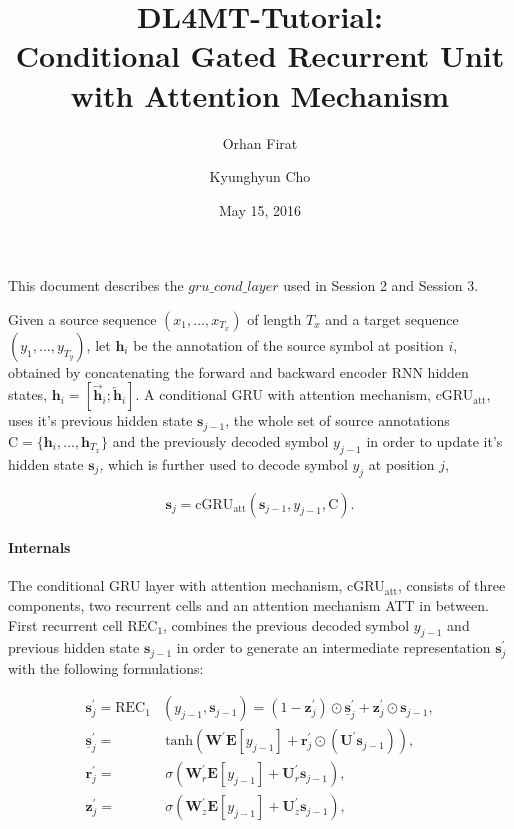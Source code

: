 \documentclass[11pt, oneside]{article}
\title{DL4MT-Tutorial: \\Conditional Gated Recurrent Unit with Attention Mechanism}
\author{Orhan Firat \and Kyunghyun Cho}
\date{May 15, 2016}
\theoremstyle{definition}
\newcommand{\vect}[1]{\mathbf{#1}}
\newcommand{\matr}[1]{\mathbf{#1}}
\newcommand{\vh}[0]{\vect{h}}
\newcommand{\vz}[0]{\vect{z}}
\newcommand{\vs}[0]{\vect{s}}
\newcommand{\vr}[0]{\vect{r}}
\newcommand{\mW}[0]{\matr{W}}
\newcommand{\mE}[0]{\matr{E}}
\newcommand{\mU}[0]{\matr{U}}
\newcommand{\ola}{\overleftarrow}
\newcommand{\ora}{\overrightarrow}
\begin{document}
\maketitle

This document describes the $gru\_cond\_layer$ used in Session 2 and Session 3.

Given a source sequence $(x_1, \dots,x_{T_x})$ of length $T_x$ and a target
sequence $(y_1,\dots,y_{T_y})$, let $\vh_i$ be the annotation of the source symbol 
at position $i$, obtained by concatenating the forward and backward encoder RNN 
hidden states, $\vh_i = [ \ora{\vh}_i; \ola{\vh}_i ]$. A conditional GRU with attention 
mechanism, cGRU$_{\text{att}}$, uses it's previous hidden state $\vs_{j-1}$, the 
whole set of source annotations $\text{C}=\lbrace\vh_i, \dots, \vh_{T_x}\rbrace$ and 
the previously decoded symbol $y_{j-1}$ in order to update it's hidden state $\vs_j$, 
which is further used to decode symbol $y_j$ at position $j$,

\begin{equation}
	\vs_j = \text{cGRU}_{\text{att}}\left(  \vs_{j-1}, y_{j-1}, \text{C}  \right).
\end{equation}

\paragraph{Internals} The conditional GRU layer with attention mechanism, 
cGRU$_{\text{att}}$, consists of three components, two 
recurrent cells and an attention mechanism ATT in between. 
First recurrent cell $\text{REC}_1$, combines the previous decoded symbol $y_{j-1}$ 
and previous hidden state $\vs_{j-1}$ in order to generate an intermediate 
representation $\vs^{\prime}_j$ with the following formulations:

\vspace{-10px}
\begin{align}
	\vs_j^{\prime} = \text{REC}_1 &  \left( y_{j-1}, \vs_{j-1}  \right) = (1 - \vz_j^{\prime}) \odot \underline{\vs}_j^{\prime} + \vz_j^{\prime} \odot \vs_{j-1},	 \\
	\underline{\vs}_j^{\prime} =& ~\text{tanh} \left(   \mW^{\prime} \mE[y_{j-1}] + \vr_j^{\prime} \odot (\mU^{\prime}\vs_{j-1})  \right), \\
	\vr_j^{\prime} =& ~ \sigma \left(  \mW_r^{\prime} \mE[y_{j-1}] + \mU_r^{\prime} \vs_{j-1}  \right), \\
	\vz_j^{\prime} =& ~ \sigma \left(  \mW_z^{\prime} \mE[y_{j-1}] + \mU_z^{\prime} \vs_{j-1}  \right),
\end{align}
\end{document}
